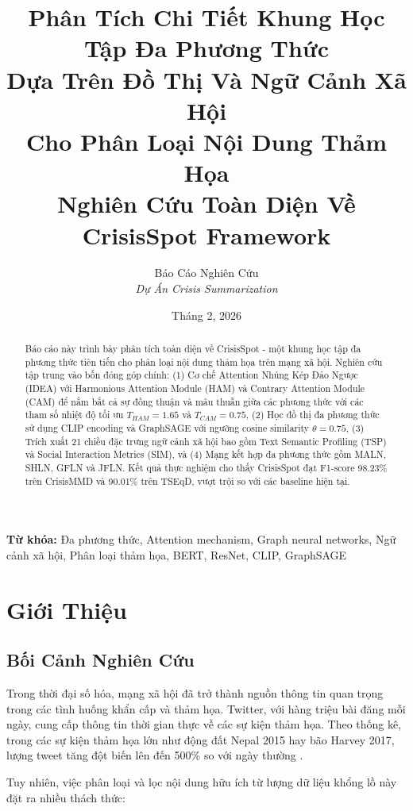 \documentclass[12pt,a4paper]{article}
\title{
    \vspace{-1cm}
    \textbf{Phân Tích Chi Tiết Khung Học Tập Đa Phương Thức\\Dựa Trên Đồ Thị Và Ngữ Cảnh Xã Hội\\Cho Phân Loại Nội Dung Thảm Họa}\\[0.5cm]
    \large Nghiên Cứu Toàn Diện Về CrisisSpot Framework
}
\author{
    Báo Cáo Nghiên Cứu\\
    \textit{Dự Án Crisis Summarization}
}
\date{Tháng 2, 2026}
\begin{document}
\maketitle

\begin{abstract}
Báo cáo này trình bày phân tích toàn diện về CrisisSpot - một khung học tập đa phương thức tiên tiến cho phân loại nội dung thảm họa trên mạng xã hội. Nghiên cứu tập trung vào bốn đóng góp chính: (1) Cơ chế Attention Nhúng Kép Đảo Ngược (IDEA) với Harmonious Attention Module (HAM) và Contrary Attention Module (CAM) để nắm bắt cả sự đồng thuận và mâu thuẫn giữa các phương thức với các tham số nhiệt độ tối ưu $T_{HAM}=1.65$ và $T_{CAM}=0.75$, (2) Học đồ thị đa phương thức sử dụng CLIP encoding và GraphSAGE với ngưỡng cosine similarity $\theta=0.75$, (3) Trích xuất 21 chiều đặc trưng ngữ cảnh xã hội bao gồm Text Semantic Profiling (TSP) và Social Interaction Metrics (SIM), và (4) Mạng kết hợp đa phương thức gồm MALN, SHLN, GFLN và JFLN. Kết quả thực nghiệm cho thấy CrisisSpot đạt F1-score 98.23\% trên CrisisMMD và 90.01\% trên TSEqD, vượt trội so với các baseline hiện tại.
\end{abstract}

\textbf{Từ khóa:} Đa phương thức, Attention mechanism, Graph neural networks, Ngữ cảnh xã hội, Phân loại thảm họa, BERT, ResNet, CLIP, GraphSAGE

\tableofcontents
\newpage

\section{Giới Thiệu}

\subsection{Bối Cảnh Nghiên Cứu}

Trong thời đại số hóa, mạng xã hội đã trở thành nguồn thông tin quan trọng trong các tình huống khẩn cấp và thảm họa. Twitter, với hàng triệu bài đăng mỗi ngày, cung cấp thông tin thời gian thực về các sự kiện thảm họa. Theo thống kê, trong các sự kiện thảm họa lớn như động đất Nepal 2015 hay bão Harvey 2017, lượng tweet tăng đột biến lên đến 500\% so với ngày thường \cite{alam2018crisismmd}.

Tuy nhiên, việc phân loại và lọc nội dung hữu ích từ lượng dữ liệu khổng lồ này đặt ra nhiều thách thức:
\end{document}
